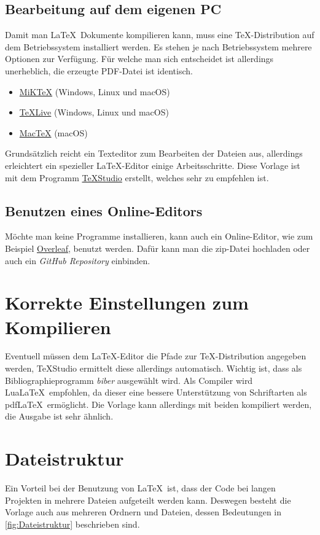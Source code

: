 \subsection{Bearbeitung auf dem eigenen PC}
Damit man \LaTeX\ Dokumente kompilieren kann, muss eine \TeX-Distribution auf dem Betriebssystem installiert werden. Es stehen je nach Betriebssystem mehrere Optionen zur Verfügung. Für welche man sich entscheidet ist allerdings unerheblich, die erzeugte PDF-Datei ist identisch. 
\begin{itemize}
	\item \href{https://miktex.org/}{MiK\TeX} (Windows, Linux und macOS)
	\item \href{https://www.tug.org/texlive/}{\TeX Live} (Windows, Linux und macOS)
	\item \href{https://www.tug.org/mactex/}{Mac\TeX} (macOS)
\end{itemize}
Grundsätzlich reicht ein Texteditor zum Bearbeiten der Dateien aus, allerdings erleichtert  ein spezieller \LaTeX-Editor einige Arbeitsschritte. Diese Vorlage ist mit dem Programm \href{https://www.texstudio.org/}{\TeX Studio} erstellt, welches sehr zu empfehlen ist.

\subsection{Benutzen eines Online-Editors}
Möchte man keine Programme installieren, kann auch ein Online-Editor, wie zum Beispiel \href{https://de.overleaf.com/}{Overleaf}, benutzt werden. Dafür kann man die zip-Datei hochladen oder auch ein \textit{GitHub Repository} einbinden.

\section{Korrekte Einstellungen zum Kompilieren}
Eventuell müssen dem \LaTeX-Editor die Pfade zur \TeX-Distribution angegeben werden, \TeX Studio ermittelt diese allerdings automatisch. Wichtig ist, dass als Bibliographieprogramm \textit{biber} ausgewählt wird. Als Compiler wird Lua\LaTeX\ empfohlen, da dieser eine bessere Unterstützung von Schriftarten als pdf\LaTeX\ ermöglicht. Die Vorlage kann allerdings mit beiden kompiliert werden, die Ausgabe ist sehr ähnlich.

\section{Dateistruktur}
Ein Vorteil bei der Benutzung von \LaTeX\ ist, dass der Code bei langen Projekten in mehrere Dateien aufgeteilt werden kann. Deswegen besteht die Vorlage auch aus mehreren Ordnern und Dateien, dessen Bedeutungen in \vref{fig:Dateistruktur} beschrieben sind.

